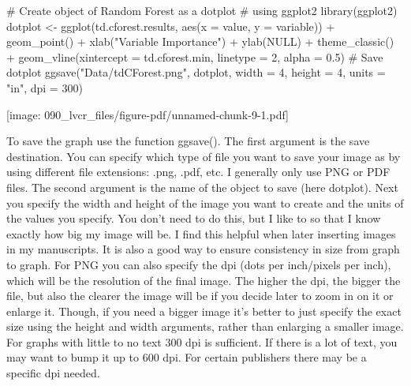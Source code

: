 \documentclass[
  10pt,
  letterpaper]{article}
\newenvironment{Shaded}{\begin{snugshade}}{\end{snugshade}}
\newcommand{\AttributeTok}[1]{\textcolor[rgb]{0.40,0.45,0.13}{#1}}
\newcommand{\CommentTok}[1]{\textcolor[rgb]{0.37,0.37,0.37}{#1}}
\newcommand{\ConstantTok}[1]{\textcolor[rgb]{0.56,0.35,0.01}{#1}}
\newcommand{\DecValTok}[1]{\textcolor[rgb]{0.68,0.00,0.00}{#1}}
\newcommand{\FloatTok}[1]{\textcolor[rgb]{0.68,0.00,0.00}{#1}}
\newcommand{\FunctionTok}[1]{\textcolor[rgb]{0.28,0.35,0.67}{#1}}
\newcommand{\NormalTok}[1]{\textcolor[rgb]{0.00,0.23,0.31}{#1}}
\newcommand{\OtherTok}[1]{\textcolor[rgb]{0.00,0.23,0.31}{#1}}
\newcommand{\SpecialCharTok}[1]{\textcolor[rgb]{0.37,0.37,0.37}{#1}}
\newcommand{\StringTok}[1]{\textcolor[rgb]{0.13,0.47,0.30}{#1}}
\renewcommand\texttt[1]{{\ttfamily\color{BrickRed}#1}}
\begin{document}
\begin{Shaded}
\begin{Highlighting}[]
\CommentTok{\# Create object of Random Forest as a dotplot}
\CommentTok{\# using ggplot2}
\FunctionTok{library}\NormalTok{(ggplot2)}
\NormalTok{dotplot }\OtherTok{\textless{}{-}} \FunctionTok{ggplot}\NormalTok{(td.cforest.results, }\FunctionTok{aes}\NormalTok{(}\AttributeTok{x =}\NormalTok{ value,}
    \AttributeTok{y =}\NormalTok{ variable)) }\SpecialCharTok{+} \FunctionTok{geom\_point}\NormalTok{() }\SpecialCharTok{+} \FunctionTok{xlab}\NormalTok{(}\StringTok{"Variable Importance"}\NormalTok{) }\SpecialCharTok{+}
    \FunctionTok{ylab}\NormalTok{(}\ConstantTok{NULL}\NormalTok{) }\SpecialCharTok{+} \FunctionTok{theme\_classic}\NormalTok{() }\SpecialCharTok{+} \FunctionTok{geom\_vline}\NormalTok{(}\AttributeTok{xintercept =}\NormalTok{ td.cforest.min,}
    \AttributeTok{linetype =} \DecValTok{2}\NormalTok{, }\AttributeTok{alpha =} \FloatTok{0.5}\NormalTok{)}
\CommentTok{\# Save dotplot}
\FunctionTok{ggsave}\NormalTok{(}\StringTok{"Data/tdCForest.png"}\NormalTok{, dotplot, }\AttributeTok{width =} \DecValTok{4}\NormalTok{, }\AttributeTok{height =} \DecValTok{4}\NormalTok{,}
    \AttributeTok{units =} \StringTok{"in"}\NormalTok{, }\AttributeTok{dpi =} \DecValTok{300}\NormalTok{)}
\end{Highlighting}
\end{Shaded}

\texttt{[image: 090\_lvcr\_files/figure-pdf/unnamed-chunk-9-1.pdf]}

To save the graph use the function \texttt{ggsave()}. The first argument
is the save destination. You can specify which type of file you want to
save your image as by using different file extensions: .png, .pdf, etc.
I generally only use PNG or PDF files. The second argument is the name
of the object to save (here \texttt{dotplot}). Next you specify the
\texttt{width} and \texttt{height} of the image you want to create and
the \texttt{units} of the values you specify. You don't need to do this,
but I like to so that I know exactly how big my image will be. I find
this helpful when later inserting images in my manuscripts. It is also a
good way to ensure consistency in size from graph to graph. For PNG you
can also specify the \texttt{dpi} (dots per inch/pixels per inch), which
will be the resolution of the final image. The higher the \texttt{dpi},
the bigger the file, but also the clearer the image will be if you
decide later to zoom in on it or enlarge it. Though, if you need a
bigger image it's better to just specify the exact size using the height
and width arguments, rather than enlarging a smaller image. For graphs
with little to no text \texttt{300} dpi is sufficient. If there is a lot
of text, you may want to bump it up to \texttt{600} dpi. For certain
publishers there may be a specific dpi needed.
\end{document}
